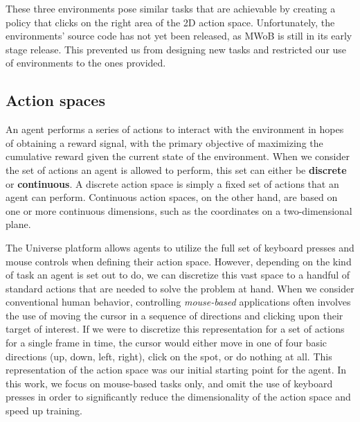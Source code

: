 \documentclass[10pt,journal,compsoc]{IEEEtran}
\begin{document}
These three environments pose similar tasks that are achievable by creating a policy that clicks on the right area of the 2D action space. Unfortunately, the environments' source code has not yet been released, as MWoB is still in its early stage release. This prevented us from designing new tasks and restricted our use of environments to the ones provided.

\subsection{Action spaces}
An agent performs a series of actions to interact with the environment in hopes of obtaining a reward signal, with the primary objective of maximizing the cumulative reward given the current state of the environment. When we consider the set of actions an agent is allowed to perform, this set can either be \textbf{discrete} or \textbf{continuous}. A discrete action space is simply a fixed set of actions that an agent can perform. Continuous action spaces, on the other hand, are based on one or more continuous dimensions, such as the coordinates on a two-dimensional plane. %

The Universe platform allows agents to utilize the full set of keyboard presses and mouse controls when defining their action space.
However, depending on the kind of task an agent is set out to do, we can discretize this vast space to a handful of standard actions that are needed to solve the problem at hand.
When we consider conventional human behavior, controlling \textit{mouse-based} applications often involves the use of moving the cursor in a sequence of directions and clicking upon their target of interest. If we were to discretize this representation for a set of actions for a single frame in time, the cursor would either move in one of four basic directions (up, down, left, right), click on the spot, or do nothing at all. This representation of the action space was our initial starting point for the agent. In this work, we focus on mouse-based tasks only, and omit the use of keyboard presses in order to significantly reduce the dimensionality of the action space and speed up training. %
\linebreak
\end{document}

